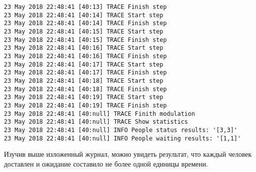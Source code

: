 \begin{lstlisting}[basicstyle=\scriptsize]
23 May 2018 22:48:41 [40:13] TRACE Finish step
23 May 2018 22:48:41 [40:14] TRACE Start step
23 May 2018 22:48:41 [40:14] TRACE Finish step
23 May 2018 22:48:41 [40:15] TRACE Start step
23 May 2018 22:48:41 [40:15] TRACE Finish step
23 May 2018 22:48:41 [40:16] TRACE Start step
23 May 2018 22:48:41 [40:16] TRACE Finish step
23 May 2018 22:48:41 [40:17] TRACE Start step
23 May 2018 22:48:41 [40:17] TRACE Finish step
23 May 2018 22:48:41 [40:18] TRACE Start step
23 May 2018 22:48:41 [40:18] TRACE Finish step
23 May 2018 22:48:41 [40:19] TRACE Start step
23 May 2018 22:48:41 [40:19] TRACE Finish step
23 May 2018 22:48:41 [40:null] TRACE Finith modulation
23 May 2018 22:48:41 [40:null] TRACE Show statistics
23 May 2018 22:48:41 [40:null] INFO People status results: '[3,3]'
23 May 2018 22:48:41 [40:null] INFO People waiting results: '[1,1]'
\end{lstlisting}

	Изучив выше изложенный журнал, можно увидеть результат, что каждый человек доставлен и ожидание составило не более одной единицы времени.
